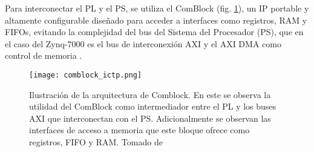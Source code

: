 \documentclass{report}
\begin{document}

\noindent Para interconectar el PL y el PS, se utiliza el ComBlock \cite{core_comblock} (fig. \ref{fig:comblock_ictp}), un IP portable y altamente configurable diseñado para acceder a interfaces como registros, RAM y FIFOs, evitando la complejidad del bus del Sistema del Procesador (PS), que en el caso del Zynq-7000 es el bus de interconexión AXI y el AXI DMA como control de memoria \cite{axi_xilinx}.\\



\begin{figure}[H]
    \centering
    \texttt{[image: comblock\_ictp.png]}
    \caption{Ilustración de la arquitectura de Comblock. En este se observa la utilidad del ComBlock como intermediador entre el PL y los buses AXI que interconectan con el PS. Adicionalmente se observan las interfaces de acceso a memoria que este bloque ofrece como registros, FIFO y RAM. Tomado de \cite{core_comblock}}
    \label{fig:comblock_ictp}
\end{figure}
\end{document}
